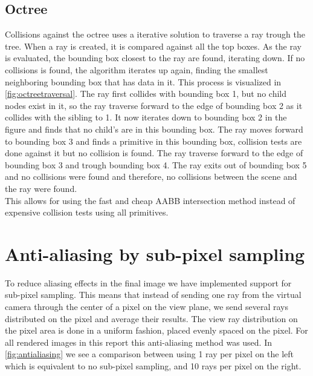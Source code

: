 \documentclass[a4paper, 12pt]{report}
\begin{document}
\subsection{Octree}
Collisions against the octree uses a iterative solution to traverse a ray trough the tree.
When a ray is created, it is compared against all the top boxes.
As the ray is evaluated, the bounding box closest to the ray are found, iterating down.
If no collisions is found, the algorithm iterates up again, finding the smallest neighboring bounding box that has data in it. This process is visualized in \autoref{fig:octreetraversal}. 
The ray first collides with bounding box 1, but no child nodes exist in it, so the ray traverse forward to the edge of bounding box 2 as it collides with the sibling to 1. 
It now iterates down to bounding box 2 in the figure and finds that no child's are in this bounding box. 
The ray moves forward to bounding box 3 and finds a primitive in this bounding box, collision tests are done against it but no collision is found.
The ray traverse forward to the edge of bounding box 3 and trough bounding box 4.
The ray exits out of bounding box 5 and no collisions were found and therefore, no collisions between the scene and the ray were found.\\

This allows for using the fast and cheap AABB intersection method instead of expensive collision tests using all primitives.

\section{Anti-aliasing by sub-pixel sampling}
To reduce aliasing effects in the final image we have implemented support for sub-pixel sampling.
This means that instead of sending one ray from the virtual camera through the center of a pixel on the view plane, we send several rays distributed on the pixel and average their results.
The view ray distribution on the pixel area is done in a uniform fashion, placed evenly spaced on the pixel.
For all rendered images in this report this anti-aliasing method was used.
In  \autoref{fig:antialiasing} we see a comparison between using 1 ray per pixel on the left which is equivalent to no sub-pixel sampling, and 10 rays per pixel on the right.
\end{document}

